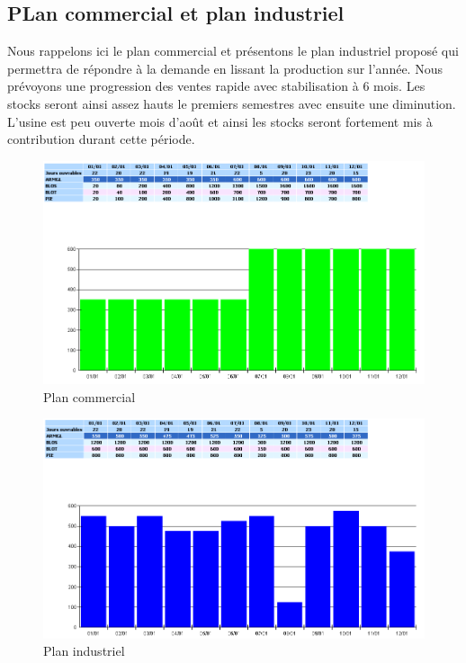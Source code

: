 \documentclass[a4paper]{../TPInsa}
\begin{document}
	\subsection{PLan commercial et plan industriel}
	
	Nous rappelons ici le plan commercial et présentons le plan industriel proposé qui permettra de répondre à la demande en lissant la production sur l'année. Nous prévoyons une progression des ventes rapide avec stabilisation à 6 mois. Les stocks seront ainsi assez hauts le premiers semestres avec ensuite une diminution. L'usine est peu ouverte mois d’août et ainsi les stocks seront fortement mis à contribution durant cette période.
	
	\begin{figure}[H]
	\centering
	\includegraphics[scale=0.6]{captures/plan_commercial.PNG}
	\caption{Plan commercial}
	\end{figure}
	
	\begin{figure}[H]
	\centering
	\includegraphics[scale=0.6]{captures/plan_industriel.PNG}
	\caption{Plan industriel}
	\end{figure}
	
\end{document}
